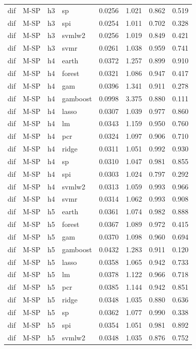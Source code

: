 \begin{ThreePartTable}
\begin{longtable}[t]{llclcccc}
dif & M-SP & h3 & sp & 0.0256 & 1.021 & 0.862 & 0.519\\
dif & M-SP & h3 & spi & 0.0254 & 1.011 & 0.702 & 0.328\\
dif & M-SP & h3 & svmlw2 & 0.0256 & 1.019 & 0.849 & 0.421\\
dif & M-SP & h3 & svmr & 0.0261 & 1.038 & 0.959 & 0.741\\
\addlinespace
dif & M-SP & h4 & earth & 0.0372 & 1.257 & 0.899 & 0.910\\
dif & M-SP & h4 & forest & 0.0321 & 1.086 & 0.947 & 0.417\\
dif & M-SP & h4 & gam & 0.0396 & 1.341 & 0.911 & 0.278\\
dif & M-SP & h4 & gamboost & 0.0998 & 3.375 & 0.880 & 0.111\\
dif & M-SP & h4 & lasso & 0.0307 & 1.039 & 0.977 & 0.860\\
dif & M-SP & h4 & lm & 0.0343 & 1.159 & 0.950 & 0.760\\
dif & M-SP & h4 & pcr & 0.0324 & 1.097 & 0.906 & 0.710\\
dif & M-SP & h4 & ridge & 0.0311 & 1.051 & 0.992 & 0.930\\
dif & M-SP & h4 & sp & 0.0310 & 1.047 & 0.981 & 0.855\\
dif & M-SP & h4 & spi & 0.0303 & 1.024 & 0.797 & 0.292\\
dif & M-SP & h4 & svmlw2 & 0.0313 & 1.059 & 0.993 & 0.966\\
dif & M-SP & h4 & svmr & 0.0314 & 1.062 & 0.993 & 0.908\\
\addlinespace
dif & M-SP & h5 & earth & 0.0361 & 1.074 & 0.982 & 0.888\\
dif & M-SP & h5 & forest & 0.0367 & 1.089 & 0.972 & 0.415\\
dif & M-SP & h5 & gam & 0.0370 & 1.098 & 0.960 & 0.694\\
dif & M-SP & h5 & gamboost & 0.0432 & 1.283 & 0.911 & 0.120\\
dif & M-SP & h5 & lasso & 0.0358 & 1.065 & 0.942 & 0.733\\
dif & M-SP & h5 & lm & 0.0378 & 1.122 & 0.966 & 0.718\\
dif & M-SP & h5 & pcr & 0.0385 & 1.144 & 0.942 & 0.851\\
dif & M-SP & h5 & ridge & 0.0348 & 1.035 & 0.880 & 0.636\\
dif & M-SP & h5 & sp & 0.0362 & 1.077 & 0.990 & 0.338\\
dif & M-SP & h5 & spi & 0.0354 & 1.051 & 0.981 & 0.892\\
dif & M-SP & h5 & svmlw2 & 0.0348 & 1.035 & 0.876 & 0.752\\

\end{longtable}
\end{ThreePartTable}

